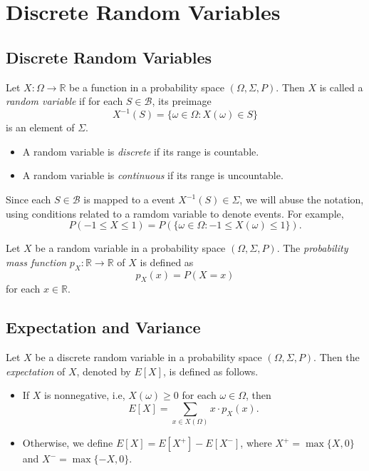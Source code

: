 \chapter{Discrete Random Variables}
\section{Discrete Random Variables}
\begin{definition}
  Let $X: \Omega \to \mathbb{R}$ be a function in a probability space
  $(\Omega, \Sigma, P)$.
  Then $X$ is called a \emph{random variable} if for each
  $S \in \mathcal{B}$, its preimage
  \begin{equation*}
    X^{-1}(S) = \{\omega \in \Omega : X(\omega) \in S\}
  \end{equation*}
  is an element of $\Sigma$.
  \begin{itemize}
    \item A random variable is \emph{discrete} if its range is countable.
    \item A random variable is \emph{continuous} if its range is uncountable.
  \end{itemize}
\end{definition}
\begin{remark}
  Since each $S \in \mathcal{B}$ is mapped to a event $X^{-1}(S) \in \Sigma$,
  we will abuse the notation, using conditions related to a ramdom variable
  to denote events.
  For example,
  \begin{equation*}
    P(-1 \leq X \leq 1) = P(\{\omega \in \Omega: -1 \leq X(\omega) \leq 1\}).
  \end{equation*}
\end{remark}

\begin{definition}
  Let $X$ be a random variable in a probability space $(\Omega, \Sigma, P)$.
  The \emph{probability mass function} $p_X: \mathbb{R} \to \mathbb{R}$ of $X$
  is defined as
  \begin{equation*}
    p_X(x) = P(X = x)
  \end{equation*}
  for each $x \in \mathbb{R}$.
\end{definition}

\section{Expectation and Variance}
\begin{definition}
  Let $X$ be a discrete random variable in a probability space
  $(\Omega, \Sigma, P)$.
  Then the \emph{expectation} of $X$, denoted by $E[X]$, is defined as
  follows.
  \begin{itemize}
    \item If $X$ is nonnegative, i.e, $X(\omega) \geq 0$ for each
      $\omega \in \Omega$, then
      \begin{equation*}
        E[X] = \sum_{x \in X(\Omega)} x \cdot p_X(x).
      \end{equation*}
    \item Otherwise, we define $E[X] = E[X^+] - E[X^-]$,
      where $X^+ = \max\{X, 0\}$ and $X^- = \max\{-X, 0\}$.
  \end{itemize}
\end{definition}

